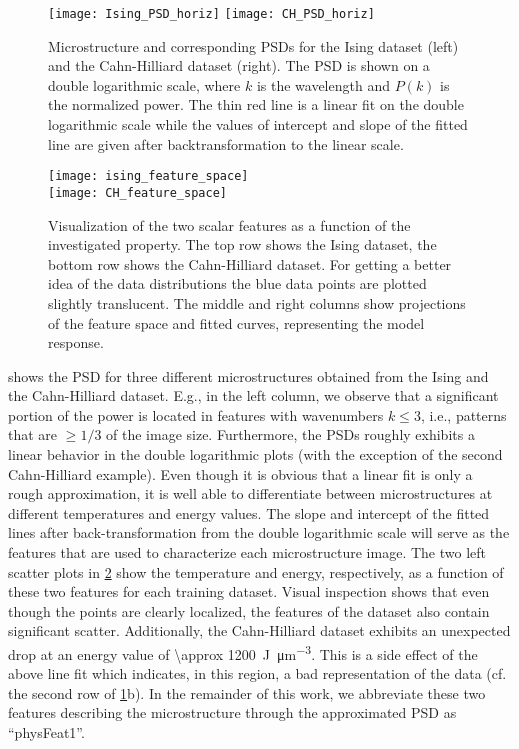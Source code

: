 \documentclass[11pt, authoryear]{elsarticle}
\begin{document}
	\begin{figure}[htb]
		\texttt{[image: Ising\_PSD\_horiz]}
		\hfill
		\texttt{[image: CH\_PSD\_horiz]}
		\caption{%
			Microstructure and corresponding \glspl{PSD} for the
			Ising dataset (left) and the Cahn-Hilliard dataset (right). 
			The \gls{PSD} is shown on a double logarithmic scale, 
			where $k$ is the wavelength and $P(k)$ is the normalized 
			power. The thin red line is a linear fit on the double
			logarithmic scale while the values of 
			intercept and slope of the fitted line are given after
			backtransformation to the linear scale. 
		}
		\label{fig:ising:psd}
	\end{figure}
	\begin{figure}[htb]
		\centering
		\texttt{[image: ising\_feature\_space]}\\
		\texttt{[image: CH\_feature\_space]}\\
		\caption{%
			Visualization of the two scalar features as a function of the
			investigated property. The top row shows the Ising dataset, the
			bottom row shows the Cahn-Hilliard dataset.
			For getting a better idea of the data distributions the blue data points 
			are plotted slightly translucent.
			The middle and right columns show projections of the feature space and 
			fitted curves, representing the model response.}
		\label{fig:ising:featurespace}
	\end{figure}
	
	 shows the \gls{PSD} for three different microstructures 
	obtained from the Ising and the Cahn-Hilliard dataset. 
	E.g., in the left column, we observe that a significant portion of the
	power is located in features with wavenumbers $k\leq 3$, i.e., patterns
	that are $\geq 1/3$ of the image size. Furthermore, the \glspl{PSD} 
	roughly exhibits a linear behavior in the double 
	logarithmic plots (with the exception of the second Cahn-Hilliard example). 
	Even though it is obvious that a linear fit is only a rough approximation, 
	it is well able to differentiate between microstructures at different 
	temperatures and energy values.	The slope and intercept of the fitted 
	lines after back-transformation from the double logarithmic scale will 
	serve as the features that are used to characterize each microstructure 
	image. 	
	The two left scatter plots in \cref{fig:ising:featurespace} show 
	the temperature and energy, respectively, as a function of these two 
	features for each training dataset. 
	Visual inspection shows that even though the points are clearly localized, 
	the features of the dataset also contain significant scatter. Additionally, 
	the Cahn-Hilliard dataset exhibits
	an unexpected drop at an energy value of \SI{\approx 1200}{\joule\per\micro\meter^3}.
	This is a side effect of the above line fit which indicates, in this region, 
	a bad representation of the data (cf. the second row of \cref{fig:ising:psd}b).
	In the remainder of this work, we abbreviate these two features describing
	the microstructure through the approximated \gls{PSD} as ``physFeat1''.
	
\end{document}
